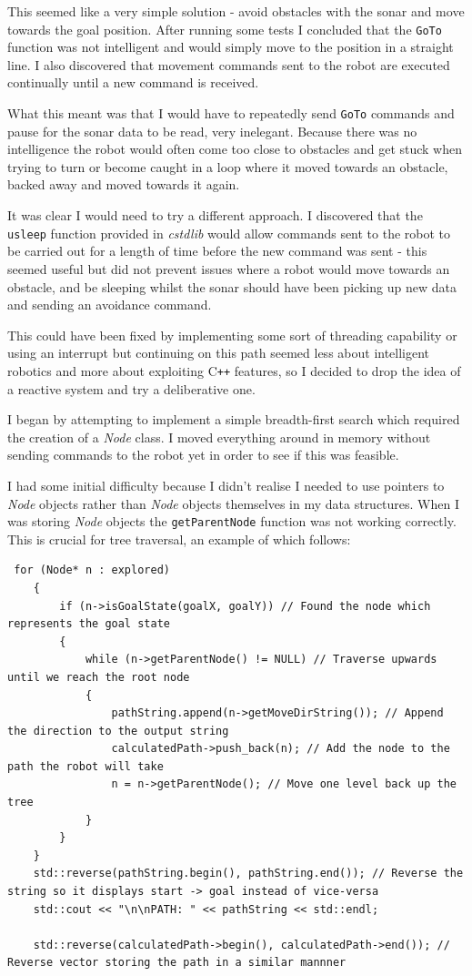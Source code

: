 \documentclass[a4paper,12pt]{article}
\begin{document}
This seemed like a very simple solution - avoid obstacles with the sonar and move towards the goal position. After running some tests I concluded that the \texttt{GoTo} function was not intelligent and would simply move to the position in a straight line. I also discovered that movement commands sent to the robot are executed continually until a new command is received.

What this meant was that I would have to repeatedly send \texttt{GoTo} commands and pause for the sonar data to be read, very inelegant. Because there was no intelligence the robot would often come too close to obstacles and get stuck when trying to turn or become caught in a loop where it moved towards an obstacle, backed away and moved towards it again.

It was clear I would need to try a different approach. I discovered that the \texttt{usleep} function provided in \textit{cstdlib} would allow commands sent to the robot to be carried out for a length of time before the new command was sent - this seemed useful but did not prevent issues where a robot would move towards an obstacle, and be sleeping whilst the sonar should have been picking up new data and sending an avoidance command.

This could have been fixed by implementing some sort of threading capability or using an interrupt but continuing on this path seemed less about intelligent robotics and more about exploiting C\texttt{++} features, so I decided to drop the idea of a reactive system and try a deliberative one.

I began by attempting to implement a simple breadth-first search which required the creation of a \textit{Node} class. I moved everything around in memory without sending commands to the robot yet in order to see if this was feasible. 

I had some initial difficulty because I didn't realise I needed to use pointers to \textit{Node} objects rather than \textit{Node} objects themselves in my data structures. When I was storing \textit{Node} objects the \texttt{getParentNode} function was not working correctly. This is crucial for tree traversal, an example of which follows:

\begin{lstlisting}
 for (Node* n : explored)
    {
        if (n->isGoalState(goalX, goalY)) // Found the node which represents the goal state
        {
            while (n->getParentNode() != NULL) // Traverse upwards until we reach the root node 
            {
                pathString.append(n->getMoveDirString()); // Append the direction to the output string
                calculatedPath->push_back(n); // Add the node to the path the robot will take
                n = n->getParentNode(); // Move one level back up the tree
            }
        }
    }
    std::reverse(pathString.begin(), pathString.end()); // Reverse the string so it displays start -> goal instead of vice-versa
    std::cout << "\n\nPATH: " << pathString << std::endl;

    std::reverse(calculatedPath->begin(), calculatedPath->end()); // Reverse vector storing the path in a similar mannner
\end{lstlisting}
\end{document}
